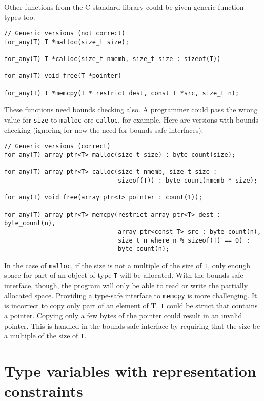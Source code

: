 Other functions from the C standard library could be given generic function types too:
\begin{lstlisting}
// Generic versions (not correct)
for_any(T) T *malloc(size_t size);

for_any(T) T *calloc(size_t nmemb, size_t size : sizeof(T))

for_any(T) void free(T *pointer)

for_any(T) T *memcpy(T * restrict dest, const T *src, size_t n);
\end{lstlisting}
These functions need bounds checking also.  A programmer
could pass the wrong value for \lstinline+size+ to \lstinline+malloc+
ore \lstinline+calloc+, for example.  Here are
versions with bounds checking (ignoring for now the need for bounds-safe interfaces):
\begin{lstlisting}
// Generic versions (correct)
for_any(T) array_ptr<T> malloc(size_t size) : byte_count(size);

for_any(T) array_ptr<T> calloc(size_t nmemb, size_t size : 
                               sizeof(T)) : byte_count(nmemb * size);

for_any(T) void free(array_ptr<T> pointer : count(1));

for_any(T) array_ptr<T> memcpy(restrict array_ptr<T> dest : byte_count(n),
                               array_ptr<const T> src : byte_count(n),
                               size_t n where n % sizeof(T) == 0) :
                               byte_count(n);
\end{lstlisting}
In the case of \lstinline+malloc+, if the size is not a multiple of the size of \lstinline+T+,
only enough space for part of an object of type \lstinline+T+ will be allocated.  With the 
bounds-safe interface, though, the program will only be able to read or write the 
partially allocated space.   Providing a type-safe interface to \lstinline+memcpy+
is more challenging.   It is incorrect to copy only part of an element of T.
\lstinline+T+ could be struct that contains a pointer.  Copying only a few bytes
of the pointer could result in an invalid pointer.
This is handled in the bounds-safe interface by requiring that the
size be a multiple of the size of \lstinline+T+.

\section{Type variables with representation constraints}

